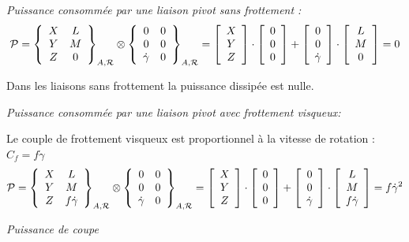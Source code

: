 \documentclass[10pt]{article}
\begin{document}
\begin{exemple}
\textit{Puissance consommée par une liaison pivot sans frottement :}
$$
\mathcal{P}=
\torseurcol{X}{Y}{Z}{L}{M}{0}{A,\mathcal{R}} \otimes 
\torseurcol{0}{0}{\dot{\gamma}}{0}{0}{0}{A,\mathcal{R}}
=
\left[\begin{array}{c}
X\\Y\\Z
\end{array}
\right]
\cdot
\left[\begin{array}{c}
0\\0\\0
\end{array}
\right]
+
\left[\begin{array}{c}
0\\0\\ \dot{\gamma}
\end{array}
\right]
\cdot
\left[\begin{array}{c}
L \\ M \\0
\end{array}
\right]
=0
$$

Dans les liaisons sans frottement la puissance dissipée est nulle. 


\textit{Puissance consommée par une liaison pivot avec frottement visqueux:}

Le couple de frottement visqueux est proportionnel à la vitesse de rotation : $C_f=f\dot{\gamma}$
$$
\mathcal{P}=
\torseurcol{X}{Y}{Z}{L}{M}{f\dot{\gamma}}{A,\mathcal{R}} \otimes 
\torseurcol{0}{0}{\dot{\gamma}}{0}{0}{0}{A,\mathcal{R}}
=
\left[\begin{array}{c}
X\\Y\\Z
\end{array}
\right]
\cdot
\left[\begin{array}{c}
0\\0\\0
\end{array}
\right]
+
\left[\begin{array}{c}
0\\0\\ \dot{\gamma}
\end{array}
\right]
\cdot
\left[\begin{array}{c}
L \\ M \\ f\dot{\gamma}
\end{array}
\right]
=f\dot{\gamma}^2
$$

\textit{Puissance de coupe}


\end{exemple}

\begin{thebibliography}{2}
\end{thebibliography}
\end{document}
